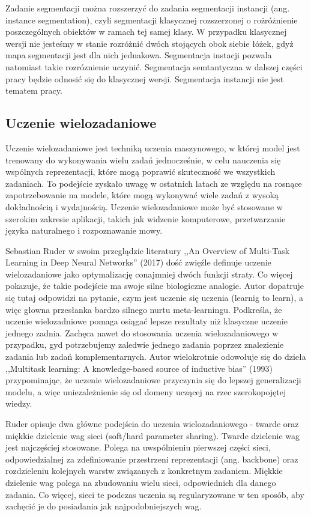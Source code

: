 Zadanie segmentacji można rozszerzyć do zadania segmentacji instancji (ang. instance segmentation), czyli segmentacji klasycznej rozszerzonej o rożróżnienie poszczególnych obiektów w ramach tej samej klasy. W przypadku klasycznej wersji nie jesteśmy w stanie rozróżnić dwóch stojących obok siebie łóżek, gdyż mapa segmentacji jest dla nich jednakowa. Segmentacja instacji pozwala natomiast takie rozróznienie uczynić. Segmentacja semtantyczna w dalszej części pracy będzie odnosić się do klasycznej wersji. Segmentacja instancji nie jest tematem pracy.
\subsection{Uczenie wielozadaniowe}
Uczenie wielozadaniowe jest techniką uczenia maszynowego, w której model jest trenowany do wykonywania wielu zadań jednocześnie, w celu nauczenia się wspólnych reprezentacji, które mogą poprawić skuteczność we wszystkich zadaniach. To podejście zyskało uwagę w ostatnich latach ze względu na rosnące zapotrzebowanie na modele, które mogą wykonywać wiele zadań z wysoką dokładnością i wydajnością. Uczenie wielozadaniowe może być stosowane w szerokim zakresie aplikacji, takich jak widzenie komputerowe, przetwarzanie języka naturalnego i rozpoznawanie mowy.

Sebastian Ruder w swoim przeglądzie literatury ,,An Overview of Multi-Task Learning in Deep Neural Networks'' (2017) \cite{ruder2017overview} dość zwięźle definuje uczenie wielozadaniowe jako optymalizację conajmniej dwóch funkcji straty. Co więcej pokazuje, że takie podejście ma swoje silne biologiczne analogie. Autor dopatruje się tutaj odpowidzi na pytanie, czym jest uczenie się uczenia (learnig to learn), a więc głowna przesłanka bardzo silnego nurtu meta-learningu. Podkreśla, że uczenie wielozadniowe pomaga osiągać lepsze rezultaty niż klasyczne uczenie jednego zadnia. Zachęca nawet do stosowania uczenia wielozadaniowego w przypadku, gyd potrzebujemy zaledwie jednego zadania poprzez znalezienie zadania lub zadań komplementarnych. Autor wielokrotnie odowołuje się do dzieła ,,Multitask learning: A knowledge-based source of inductive bias'' (1993) \cite{caruana1993multitask} przypominając, że uczenie wielozadaniowe przyczynia się do lepszej generalizacji modelu, a więc uniezależnienie się od domeny uczącej na rzec szerokopojętej wiedzy.

Ruder opisuje dwa główne podejścia do uczenia wielozadaniowego - twarde oraz miękkie dzielenie wag sieci (soft/hard parameter sharing). Twarde dzielenie wag jest najczęściej stosowane. Polega na uwspólnieniu pierwszej części sieci, odpowiedzialnej za zdefiniowanie przestrzeni reprezentacji (ang. backbone) oraz rozdzieleniu kolejnych warstw związanych z konkretnym zadaniem. Miękkie dzielenie wag polega na zbudowaniu wielu sieci, odpowiednich dla danego zadania. Co więcej, sieci te podczas uczenia są regularyzowane w ten sposób, aby zachęcić je do posiadania jak najpodobniejszych wag.

